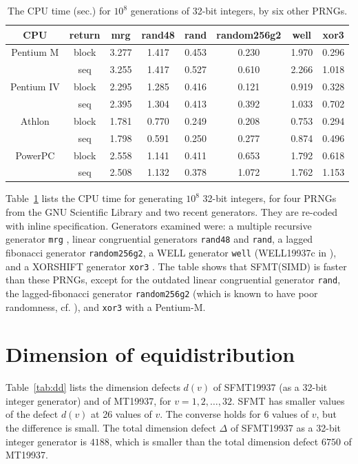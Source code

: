 \documentclass{svmult}
\begin{document}
\begin{table}
\begin{center}
\begin{tabular}{|c|c||c|c|c|c|c|c|}
\hline
CPU & return & mrg & rand48 & rand & random256g2 & well & xor3  \\ \hline \hline
Pentium M & block & 3.277  & 1.417  & 0.453  & 0.230  & 1.970  & 0.296 \\ 
\cline{2-8}
 & seq & 3.255  & 1.417  & 0.527  & 0.610  & 2.266  & 1.018 \\ \hline
Pentium IV & block & 2.295  & 1.285  & 0.416  & 0.121  & 0.919  & 0.328 \\ 
\cline{2-8}
 & seq & 2.395  & 1.304  & 0.413  & 0.392  & 1.033  & 0.702 \\ \hline
Athlon & block & 1.781  & 0.770  & 0.249  & 0.208  & 0.753  & 0.294 \\ 
\cline{2-8}
 & seq & 1.798  & 0.591  & 0.250  & 0.277  & 0.874  & 0.496 \\ \hline
PowerPC & block & 2.558  & 1.141  & 0.411  & 0.653  & 1.792  & 0.618 \\ 
\cline{2-8}
 & seq & 2.508  & 1.132  & 0.378  & 1.072  & 1.762  & 1.153 \\ \hline
\end{tabular}
\end{center}
\caption{The CPU time (sec.) for $10^8$ generations of 32-bit integers,
by six other PRNGs.}\label{tab:speed-other}
\end{table}
Table~\ref{tab:speed-other} lists the CPU time for generating
$10^8$ 32-bit integers, for four PRNGs from the GNU Scientific Library
and two recent generators. 
They are re-coded with inline specification. 
Generators examined were:
a multiple recursive generator {\tt mrg} \cite{MRG}, 
linear congruential generators {\tt rand48} and {\tt rand}, 
a lagged fibonacci generator {\tt random256g2},
a WELL generator {\tt well} (WELL19937c in \cite{WELL}),
and a XORSHIFT generator {\tt xor3} 
\cite{XORSHIFT} \cite{XORSHIFT-MAR}.
The table shows that SFMT(SIMD) is faster than
these PRNGs, except for the outdated
linear congruential generator {\tt rand},
the lagged-fibonacci
generator {\tt random256g2} 
(which is known to
 have poor randomness, cf. \cite{SUM}),
and {\tt xor3} with a Pentium-M.

\section{Dimension of equidistribution}
Table~\ref{tab:dd} lists the dimension defects $d(v)$
of SFMT19937 (as a 32-bit integer generator) 
and of MT19937, for $v=1,2,\ldots, 32$.
SFMT has smaller values of the defect $d(v)$
at 26 values of $v$. The converse holds for 6 values of
$v$, but the difference is small.
The total dimension defect $\Delta$ of SFMT19937
as a 32-bit integer generator is $4188$, 
which is smaller than the total dimension defect $6750$ of MT19937.
\end{document}
